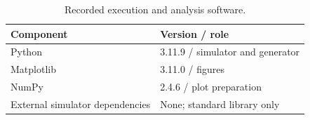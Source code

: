 \begin{table}[htbp]\centering\small
\caption{Recorded execution and analysis software.}
\begin{tabular}{ll}\toprule
Component & Version / role\\\midrule
Python & 3.11.9 / simulator and generator\\
Matplotlib & 3.11.0 / figures\\
NumPy & 2.4.6 / plot preparation\\
External simulator dependencies & None; standard library only\\
\bottomrule\end{tabular}
\end{table}
